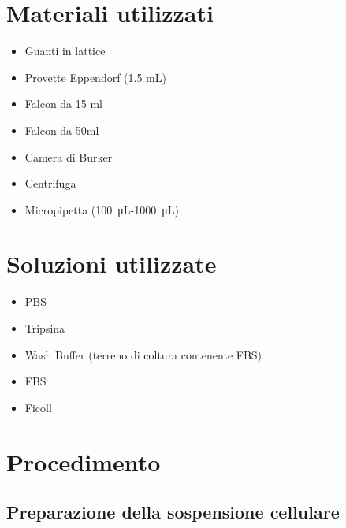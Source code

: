 \section{Materiali utilizzati}

\begin{itemize}
\item Guanti in lattice
\item Provette Eppendorf (1.5 mL)
\item Falcon da 15 ml
\item Falcon da 50ml
\item Camera di Burker
\item Centrifuga
\item Micropipetta (\SI{100}{\micro\liter}-\SI{1000}{\micro\liter})

\end{itemize}

\section{Soluzioni utilizzate}

\begin{itemize}

\item PBS
\item Tripsina
\item Wash Buffer (terreno di coltura contenente FBS)
\item FBS
\item Ficoll

\end{itemize}

\section{Procedimento}

\subsection{Preparazione della sospensione cellulare}

